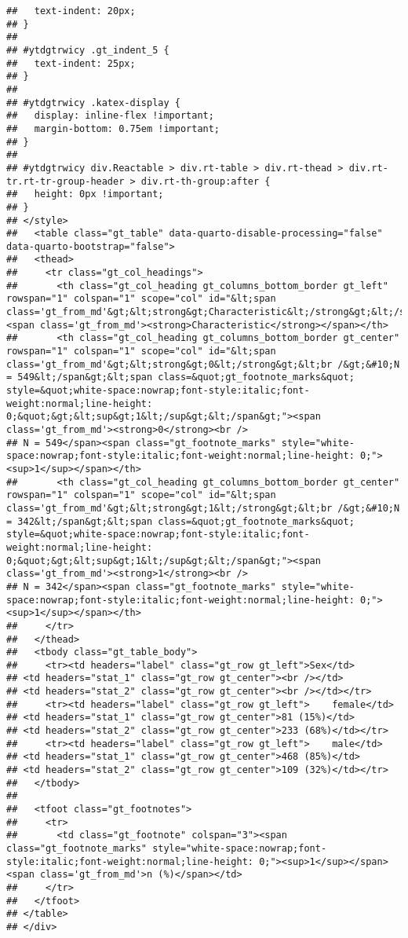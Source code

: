 \documentclass[
]{article}
\begin{document}
\begin{verbatim}
##   text-indent: 20px;
## }
## 
## #ytdgtrwicy .gt_indent_5 {
##   text-indent: 25px;
## }
## 
## #ytdgtrwicy .katex-display {
##   display: inline-flex !important;
##   margin-bottom: 0.75em !important;
## }
## 
## #ytdgtrwicy div.Reactable > div.rt-table > div.rt-thead > div.rt-tr.rt-tr-group-header > div.rt-th-group:after {
##   height: 0px !important;
## }
## </style>
##   <table class="gt_table" data-quarto-disable-processing="false" data-quarto-bootstrap="false">
##   <thead>
##     <tr class="gt_col_headings">
##       <th class="gt_col_heading gt_columns_bottom_border gt_left" rowspan="1" colspan="1" scope="col" id="&lt;span class='gt_from_md'&gt;&lt;strong&gt;Characteristic&lt;/strong&gt;&lt;/span&gt;"><span class='gt_from_md'><strong>Characteristic</strong></span></th>
##       <th class="gt_col_heading gt_columns_bottom_border gt_center" rowspan="1" colspan="1" scope="col" id="&lt;span class='gt_from_md'&gt;&lt;strong&gt;0&lt;/strong&gt;&lt;br /&gt;&#10;N = 549&lt;/span&gt;&lt;span class=&quot;gt_footnote_marks&quot; style=&quot;white-space:nowrap;font-style:italic;font-weight:normal;line-height: 0;&quot;&gt;&lt;sup&gt;1&lt;/sup&gt;&lt;/span&gt;"><span class='gt_from_md'><strong>0</strong><br />
## N = 549</span><span class="gt_footnote_marks" style="white-space:nowrap;font-style:italic;font-weight:normal;line-height: 0;"><sup>1</sup></span></th>
##       <th class="gt_col_heading gt_columns_bottom_border gt_center" rowspan="1" colspan="1" scope="col" id="&lt;span class='gt_from_md'&gt;&lt;strong&gt;1&lt;/strong&gt;&lt;br /&gt;&#10;N = 342&lt;/span&gt;&lt;span class=&quot;gt_footnote_marks&quot; style=&quot;white-space:nowrap;font-style:italic;font-weight:normal;line-height: 0;&quot;&gt;&lt;sup&gt;1&lt;/sup&gt;&lt;/span&gt;"><span class='gt_from_md'><strong>1</strong><br />
## N = 342</span><span class="gt_footnote_marks" style="white-space:nowrap;font-style:italic;font-weight:normal;line-height: 0;"><sup>1</sup></span></th>
##     </tr>
##   </thead>
##   <tbody class="gt_table_body">
##     <tr><td headers="label" class="gt_row gt_left">Sex</td>
## <td headers="stat_1" class="gt_row gt_center"><br /></td>
## <td headers="stat_2" class="gt_row gt_center"><br /></td></tr>
##     <tr><td headers="label" class="gt_row gt_left">    female</td>
## <td headers="stat_1" class="gt_row gt_center">81 (15%)</td>
## <td headers="stat_2" class="gt_row gt_center">233 (68%)</td></tr>
##     <tr><td headers="label" class="gt_row gt_left">    male</td>
## <td headers="stat_1" class="gt_row gt_center">468 (85%)</td>
## <td headers="stat_2" class="gt_row gt_center">109 (32%)</td></tr>
##   </tbody>
##   
##   <tfoot class="gt_footnotes">
##     <tr>
##       <td class="gt_footnote" colspan="3"><span class="gt_footnote_marks" style="white-space:nowrap;font-style:italic;font-weight:normal;line-height: 0;"><sup>1</sup></span> <span class='gt_from_md'>n (%)</span></td>
##     </tr>
##   </tfoot>
## </table>
## </div>
\end{verbatim}
\end{document}
